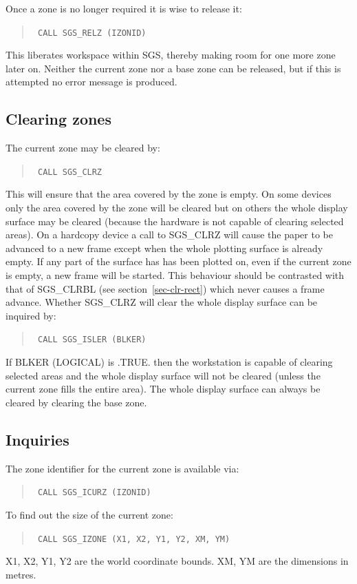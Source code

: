\documentclass[11pt]{article}
\newcommand{\hyperref}[4]{#2\ref{#4}#3}
\newcommand{\htmlref}[2]{#1}
\begin{document}
Once a zone is no longer required it is wise to release it:
\begin{quote}{\tt
    CALL \htmlref{SGS\_RELZ}{SGS_RELZ} (IZONID)}
\end{quote}
This liberates workspace within SGS, thereby making
room for one more zone later on.  Neither the current zone nor a base zone
can be released, but if this is attempted no error message is produced.

\subsection {Clearing zones}

The current zone may be cleared by:
\begin{quote}{\tt
    CALL \htmlref{SGS\_CLRZ}{SGS_CLRZ}}
\end{quote}
This will ensure that the area covered by the zone is empty.  On some devices
only the area covered by the zone will be cleared but on others the whole
display surface may be cleared (because the hardware is
not capable of clearing selected
areas).  On a hardcopy device a call to SGS\_CLRZ will cause the paper to
be advanced to a new
frame except when the whole plotting surface is already empty.  If any part of
the surface has has been plotted on, even if the current zone is empty, a new
frame will be started.  This behaviour should be contrasted with
that of \htmlref{SGS\_CLRBL}{SGS_CLRBL} (see
\hyperref{this section}{section~}{}{sec-clr-rect}) which
never causes a frame advance.  Whether SGS\_CLRZ will clear the whole display
surface can be inquired by:
\begin{quote}{\tt
    CALL \htmlref{SGS\_ISLER}{SGS_ISLER} (BLKER)}
\end{quote}
If BLKER (LOGICAL) is .TRUE. then the workstation is capable of
clearing selected areas and the whole display surface will not be cleared
(unless the current zone fills
the entire area).  The whole display surface can always be cleared by
clearing the base zone.

\subsection {Inquiries}

The zone identifier for the current zone is available via:
\begin{quote}{\tt
    CALL \htmlref{SGS\_ICURZ}{SGS_ICURZ} (IZONID)}
\end{quote}
To find out the size of the current zone:
\begin{quote}{\tt
    CALL \htmlref{SGS\_IZONE}{SGS_IZONE} (X1, X2, Y1, Y2, XM, YM)}
\end{quote}
X1, X2, Y1, Y2 are the world coordinate bounds.  XM, YM
are the dimensions in metres.
\end{document}

